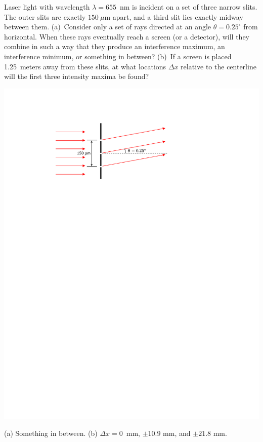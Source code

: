 \begin{Exercise}
Laser light with wavelength $\lambda=655$~nm is incident on a set of three narrow slits.  The outer slits are exactly $150~\mu$m apart, and a third slit lies exactly midway between them.  (a)~Consider only a set of rays directed at an angle
$\theta=0.25^\circ$ from horizontal.  When these rays eventually reach a screen (or a detector), will they combine in such a way that they produce an interference maximum, an interference minimum, or something in between?  (b)~If a screen is placed 1.25~meters away from these slits, at what locations $\Delta x$ relative to the centerline will the first three intensity maxima be found?
\begin{center}
\includegraphics[scale=0.9]{M_problems/waves_velocity/three_slits.pdf}
\end{center}
\end{Exercise}
\begin{Answer}
(a) Something in between.  (b) $\Delta x=0$~mm, $\pm 10.9$ mm, and $\pm 21.8$ mm.
\end{Answer}


